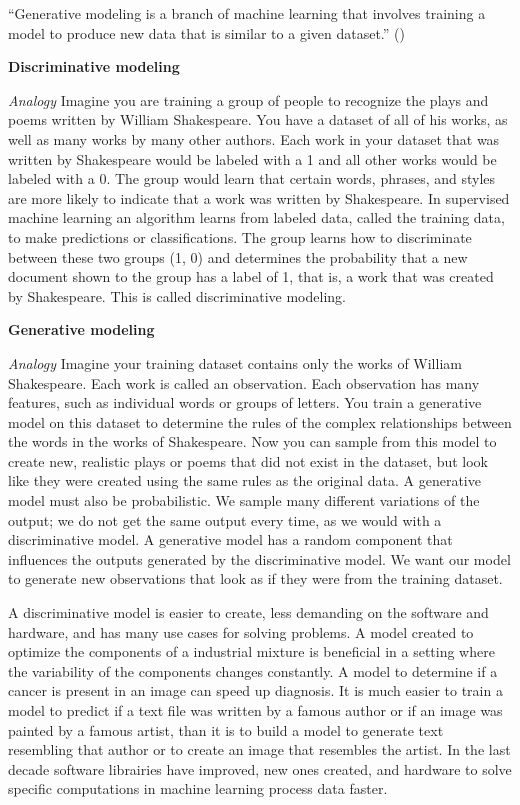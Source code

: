 \documentclass[10pt, letterpaper, twoside]{article}
\begin{document}
\enquote{Generative modeling is a branch of machine learning that involves training a model to produce new data that is similar to a given dataset.} (\cite[4]{foster_david_2023})

\textbf{Discriminative modeling}

\textit{Analogy} Imagine you are training a group of people to recognize the plays and poems written by William Shakespeare. You have a dataset of all of his works, as well as many works by many other authors. Each work in your dataset that was written by Shakespeare would be labeled with a 1 and all other works would be labeled with a 0. The group would learn that certain words, phrases, and styles are more likely to indicate that a work was written by Shakespeare. In supervised machine learning an algorithm learns from labeled data, called the training data, to make predictions or classifications. The group learns how to discriminate between these two groups (1, 0) and determines the probability that a new document shown to the group has a label of 1, that is, a work that was created by Shakespeare. This is called discriminative modeling.

\textbf{Generative modeling}

\textit{Analogy} Imagine your training dataset contains only the works of William Shakespeare. Each work is called an observation. Each observation has many features, such as individual words or groups of letters. You train a generative model on this dataset to determine the rules of the complex relationships between the words in the works of Shakespeare. Now you can sample from this model to create new, realistic plays or poems that did not exist in the dataset, but look like they were created using the same rules as the original data. A generative model must also be probabilistic. We sample many different variations of the output; we do not get the same output every time, as we would with a discriminative model. A generative model has a random component that influences the outputs generated by the discriminative model. We want our model to generate new observations that look as if they were from the training dataset.

A discriminative model is easier to create, less demanding on the software and hardware, and has many use cases for solving problems. A model created to optimize the components of a industrial mixture is beneficial in a setting where the variability of the components changes constantly. A model to determine if a cancer is present in an image can speed up diagnosis. It is much easier to train a model to predict if a text file was written by a famous author or if an image was painted by a famous artist, than it is to build a model to generate text resembling that author or to create an image that resembles the artist. In the last decade software librairies have improved, new ones created, and hardware to solve specific computations in machine learning process data faster.
\end{document}
